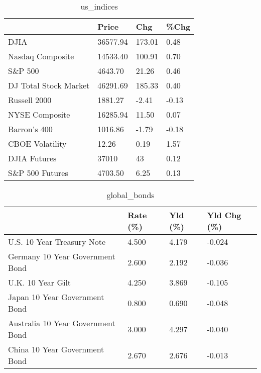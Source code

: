\documentclass{article}%
\begin{document}
%


\begin{table}[htbp]%
\caption{us\_indices}%
\centering%
\begin{adjustbox}{width=1\textwidth}%
\begin{tabular}{llll}
\toprule
                      &    Price &    Chg &  \%Chg \\
\midrule
                 DJIA & 36577.94 & 173.01 &  0.48 \\
     Nasdaq Composite & 14533.40 & 100.91 &  0.70 \\
              S\&P 500 &  4643.70 &  21.26 &  0.46 \\
DJ Total Stock Market & 46291.69 & 185.33 &  0.40 \\
         Russell 2000 &  1881.27 &  -2.41 & -0.13 \\
       NYSE Composite & 16285.94 &  11.50 &  0.07 \\
         Barron's 400 &  1016.86 &  -1.79 & -0.18 \\
      CBOE Volatility &    12.26 &   0.19 &  1.57 \\
         DJIA Futures &    37010 &     43 &  0.12 \\
      S\&P 500 Futures &  4703.50 &   6.25 &  0.13 \\
\bottomrule
\end{tabular}
%
\end{adjustbox}%
\end{table}

%


\begin{table}[htbp]%
\caption{global\_bonds}%
\centering%
\begin{adjustbox}{width=1\textwidth}%
\begin{tabular}{llll}
\toprule
                                  & Rate (\%) & Yld (\%) & Yld Chg (\%) \\
\midrule
       U.S. 10 Year Treasury Note &    4.500 &   4.179 &      -0.024 \\
  Germany 10 Year Government Bond &    2.600 &   2.192 &      -0.036 \\
                U.K. 10 Year Gilt &    4.250 &   3.869 &      -0.105 \\
    Japan 10 Year Government Bond &    0.800 &   0.690 &      -0.048 \\
Australia 10 Year Government Bond &    3.000 &   4.297 &      -0.040 \\
    China 10 Year Government Bond &    2.670 &   2.676 &      -0.013 \\
\bottomrule
\end{tabular}
%
\end{adjustbox}%
\end{table}
\end{document}
